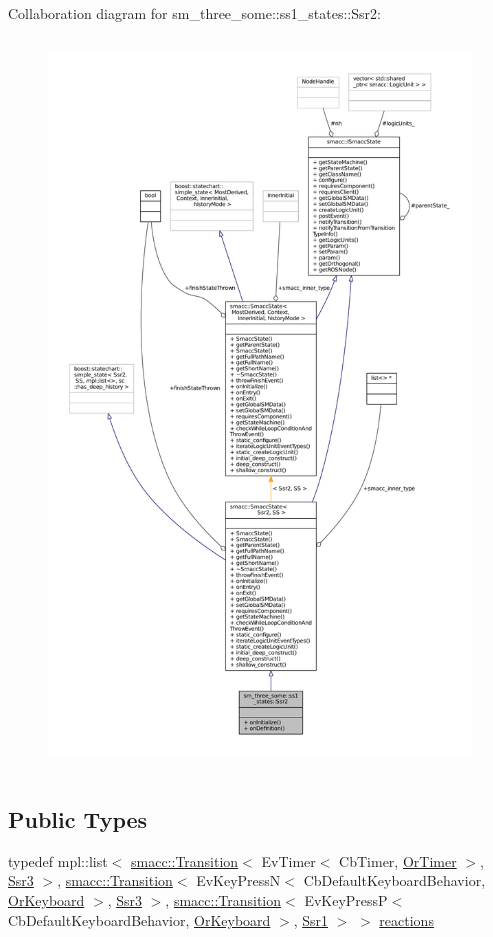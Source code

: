 Collaboration diagram for sm\+\_\+three\+\_\+some\+:\+:ss1\+\_\+states\+:\+:Ssr2\+:
\nopagebreak
\begin{figure}[H]
\begin{center}
\leavevmode
\includegraphics[height=550pt]{structsm__three__some_1_1ss1__states_1_1Ssr2__coll__graph}
\end{center}
\end{figure}
\subsection*{Public Types}
\begin{DoxyCompactItemize}
\item 
typedef mpl\+::list$<$ \hyperlink{classsmacc_1_1Transition}{smacc\+::\+Transition}$<$ Ev\+Timer$<$ Cb\+Timer, \hyperlink{classsm__three__some_1_1OrTimer}{Or\+Timer} $>$, \hyperlink{structsm__three__some_1_1ss1__states_1_1Ssr3}{Ssr3} $>$, \hyperlink{classsmacc_1_1Transition}{smacc\+::\+Transition}$<$ Ev\+Key\+PressN$<$ Cb\+Default\+Keyboard\+Behavior, \hyperlink{classsm__three__some_1_1OrKeyboard}{Or\+Keyboard} $>$, \hyperlink{structsm__three__some_1_1ss1__states_1_1Ssr3}{Ssr3} $>$, \hyperlink{classsmacc_1_1Transition}{smacc\+::\+Transition}$<$ Ev\+Key\+PressP$<$ Cb\+Default\+Keyboard\+Behavior, \hyperlink{classsm__three__some_1_1OrKeyboard}{Or\+Keyboard} $>$, \hyperlink{structsm__three__some_1_1ss1__states_1_1Ssr1}{Ssr1} $>$ $>$ \hyperlink{structsm__three__some_1_1ss1__states_1_1Ssr2_ace967d354888d5ed4b12f987c6357843}{reactions}
\end{DoxyCompactItemize}

